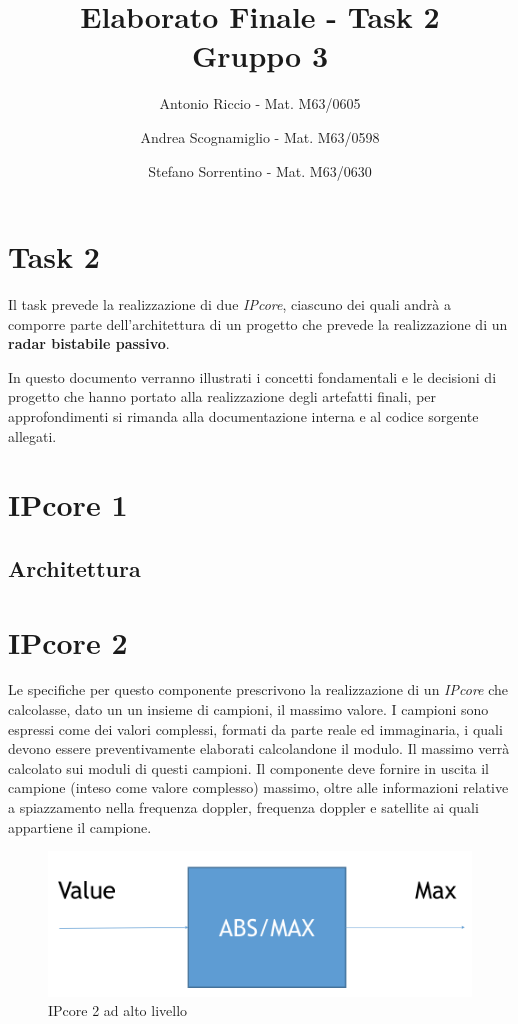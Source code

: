 \documentclass[12pt,a4paper,twoside,openany]{book}
\author{Antonio Riccio - Mat. M63/0605
\and Andrea Scognamiglio - Mat. M63/0598
\and Stefano Sorrentino - Mat. M63/0630}
\title{Elaborato Finale - Task 2 \\ Gruppo 3}
\begin{document}
\frontmatter
\maketitle
\tableofcontents
\setcounter{page}{1}
\mainmatter
\chapter*{Task 2}
Il task prevede la realizzazione di due \textit{IPcore}, ciascuno dei quali andrà a comporre parte dell'architettura di un progetto che prevede la realizzazione di un \textbf{radar bistabile passivo}. 

In questo documento verranno illustrati i concetti fondamentali e le decisioni di progetto che hanno portato alla realizzazione degli artefatti finali, per approfondimenti si rimanda alla documentazione interna e al codice sorgente allegati. 

\chapter{IPcore 1}
\section{Architettura}

\chapter{IPcore 2}
Le specifiche per questo componente prescrivono la realizzazione di un \textit{IPcore} che calcolasse, dato un un insieme di campioni, il massimo valore. I campioni sono espressi come dei valori complessi, formati da parte reale ed immaginaria, i quali devono essere preventivamente elaborati calcolandone il modulo. Il massimo verrà calcolato sui moduli di questi campioni. Il componente deve fornire in uscita il campione (inteso come valore complesso) massimo, oltre alle informazioni relative a spiazzamento nella frequenza doppler, frequenza doppler e satellite ai quali appartiene il campione.

\begin{figure}[hb]
\begin{center}
\includegraphics[scale=0.6, keepaspectratio]{immagini/ipcore2_toplevel}
\caption{IPcore 2 ad alto livello}
\label{ipcore2_top}
\end{center}
\end{figure}
\clearpage
\end{document}
